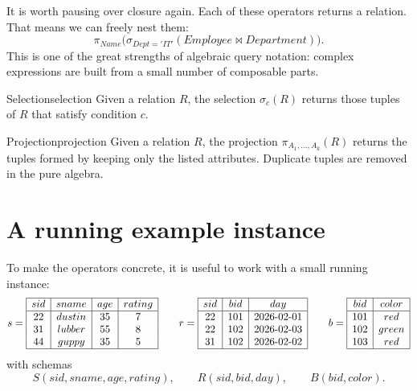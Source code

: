 \documentclass[11pt,a4paper,openany]{book}
\newcommand{\RAselect}{\sigma}
\newcommand{\RAproject}{\pi}
\newcommand{\join}{\bowtie}
\begin{document}
It is worth pausing over closure again. Each of these operators returns a relation. That means we can freely nest them:
\[
\RAproject_{Name}\bigl(\RAselect_{Dept='IT'}(Employee \join Department)\bigr).
\]
This is one of the great strengths of algebraic query notation: complex expressions are built from a small number of composable parts.

\begin{definition}{Selection}{selection}
Given a relation \(R\), the selection \(\RAselect_c(R)\) returns those tuples of \(R\) that satisfy condition \(c\).
\end{definition}

\begin{definition}{Projection}{projection}
Given a relation \(R\), the projection \(\RAproject_{A_1,\dots,A_k}(R)\) returns the tuples formed by keeping only the listed attributes. Duplicate tuples are removed in the pure algebra.
\end{definition}

\section{A running example instance}
To make the operators concrete, it is useful to work with a small running instance:
\[
s=\begin{array}{|c|c|c|c|}\hline
sid&sname&age&rating\\\hline
22&dustin&35&7\\
31&lubber&55&8\\
44&guppy&35&5\\\hline
\end{array}
\qquad
r=\begin{array}{|c|c|c|}\hline
sid&bid&day\\\hline
22&101&2026\text{-}02\text{-}01\\
22&102&2026\text{-}02\text{-}03\\
31&102&2026\text{-}02\text{-}02\\\hline
\end{array}
\qquad
b=\begin{array}{|c|c|}\hline
bid&color\\\hline
101&red\\
102&green\\
103&red\\\hline
\end{array}
\]
with schemas
\[
S(sid,sname,age,rating),\qquad
R(sid,bid,day),\qquad
B(bid,color).
\]
\end{document}
